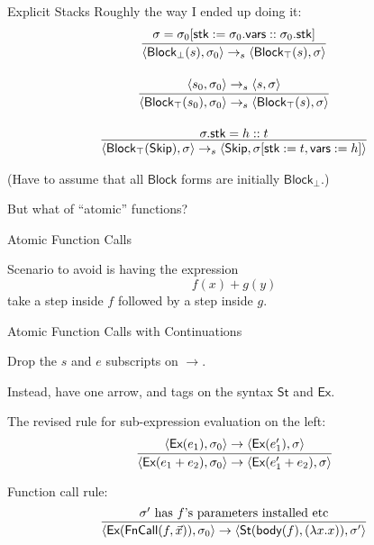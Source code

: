 \documentclass[compress,dvips,color=usenames,xcolor=dvipsnames]{beamer}
\begin{document}
\begin{frame}{Explicit Stacks}
Roughly the way I ended up doing it:
\[
\begin{array}{c}
\infer{
  \langle \textsf{Block}_\bot(s), \sigma_0 \rangle \rightarrow_s
  \langle \textsf{Block}_\top(s), \sigma\rangle
}{
  \sigma =
  \sigma_0[\textsf{stk} := \sigma_0.\textsf{vars} :: \sigma_0.\textsf{stk}]
}\\[5mm]
\infer{
  \langle \textsf{Block}_\top(s_0), \sigma_0\rangle \rightarrow_s
  \langle \textsf{Block}_\top(s), \sigma\rangle
}{
  \langle s_0,\sigma_0 \rangle \rightarrow_s \langle s, \sigma\rangle
}\\[5mm]
\infer{
  \langle\textsf{Block}_\top(\textsf{Skip}), \sigma\rangle
  \rightarrow_s
  \langle
     \textsf{Skip},
     \sigma[\textsf{stk} := t, \textsf{vars} := h]
  \rangle
}{\sigma.\textsf{stk} = h :: t}
\end{array}
\]

(Have to assume that all $\textsf{Block}$ forms are initially
$\textsf{Block}_\bot$.)

\bigskip
But what of ``atomic'' functions?
\end{frame}

\begin{frame}{Atomic Function Calls}

Scenario to avoid is having the expression
\[
f(x) + g(y)
\]
take a step inside $f$ followed by a step inside $g$.

\end{frame}

\begin{frame}{Atomic Function Calls with Continuations}

Drop the $s$ and $e$ subscripts on $\rightarrow$.

\medskip
Instead, have one arrow, and tags on the syntax $\textsf{St}$ and
$\textsf{Ex}$.

\bigskip
The revised rule for sub-expression evaluation on the left:
\[
\infer{
  \langle \textsf{Ex}(e_1 + e_2), \sigma_0 \rangle
  \rightarrow
  \langle \textsf{Ex}(e_1' + e_2), \sigma \rangle
}{
  \langle \textsf{Ex}(e_1), \sigma_0\rangle
  \rightarrow
  \langle \textsf{Ex}(e_1'), \sigma \rangle
}
\]

\bigskip
Function call rule:
\[
\infer{
  \langle \textsf{Ex}(\textsf{FnCall}(f,\vec{x})), \sigma_0\rangle
  \rightarrow
  \langle \textsf{St}(\textsf{body}(f), (\lambda x. x)), \sigma'\rangle
}{
  \mbox{$\sigma'$ has $f$'s parameters installed etc}
}
\]


\end{frame}
\end{document}
